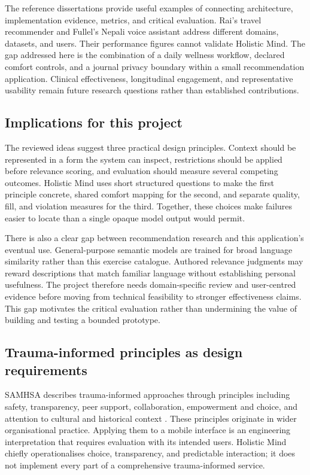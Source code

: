 The reference dissertations provide useful examples of connecting architecture, implementation evidence, metrics, and critical evaluation. Rai's travel recommender and Fullel's Nepali voice assistant address different domains, datasets, and users. Their performance figures cannot validate Holistic Mind. The gap addressed here is the combination of a daily wellness workflow, declared comfort controls, and a journal privacy boundary within a small recommendation application. Clinical effectiveness, longitudinal engagement, and representative usability remain future research questions rather than established contributions.

\subsection{Implications for this project}

The reviewed ideas suggest three practical design principles. Context should be represented in a form the system can inspect, restrictions should be applied before relevance scoring, and evaluation should measure several competing outcomes. Holistic Mind uses short structured questions to make the first principle concrete, shared comfort mapping for the second, and separate quality, fill, and violation measures for the third. Together, these choices make failures easier to locate than a single opaque model output would permit.

There is also a clear gap between recommendation research and this application's eventual use. General-purpose semantic models are trained for broad language similarity rather than this exercise catalogue. Authored relevance judgments may reward descriptions that match familiar language without establishing personal usefulness. The project therefore needs domain-specific review and user-centred evidence before moving from technical feasibility to stronger effectiveness claims. This gap motivates the critical evaluation rather than undermining the value of building and testing a bounded prototype.

\subsection{Trauma-informed principles as design requirements}

SAMHSA describes trauma-informed approaches through principles including safety, transparency, peer support, collaboration, empowerment and choice, and attention to cultural and historical context \citep{samhsa}. These principles originate in wider organisational practice. Applying them to a mobile interface is an engineering interpretation that requires evaluation with its intended users. Holistic Mind chiefly operationalises choice, transparency, and predictable interaction; it does not implement every part of a comprehensive trauma-informed service.

